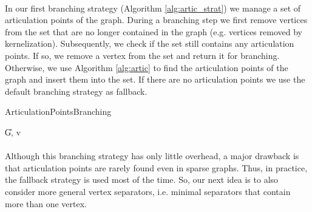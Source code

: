 \documentclass[]{article}
\begin{document}
\paragraph{}
In our first branching strategy (Algorithm \ref{alg:artic_strat}) we manage a set of articulation points of the graph. During a branching step we first remove vertices from the set that are no longer contained in the graph (e.g. vertices removed by kernelization). Subsequently, we check if the set still contains any articulation points. If so, we remove a vertex from the set and return it for branching. Otherwise, we use Algorithm \ref{alg:artic} to find the articulation points of the graph and insert them into the set. If there are no articulation points we use the default branching strategy as fallback. 

\begin{algorithm}
	\caption{ArticulationPointsBranching}\label{alg:artic_strat}
	\DontPrintSemicolon
	
	
	\U{G, v}
	
	
\end{algorithm}



\paragraph{}
Although this branching strategy has only little overhead, a major drawback  is that articulation points are rarely found even in sparse graphs. Thus, in practice, the fallback strategy is used most of the time. So, our next idea is to also consider more general vertex separators, i.e. minimal separators that contain more than one vertex. 
\end{document}
